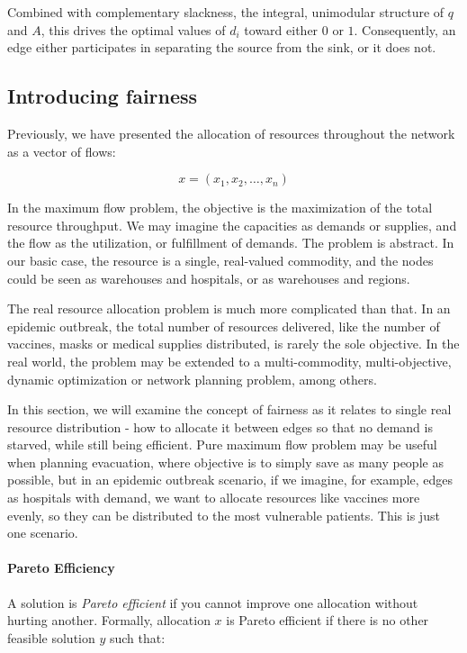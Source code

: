 \documentclass[12pt, openany]{article}
\begin{document}
Combined with complementary slackness, the integral, unimodular structure of \(q\) and \(A\), this drives the optimal values of \(d_i\) toward either \(0\) or \(1\). Consequently, an edge either participates in separating the source from the sink, or it does not.


\subsection{Introducing fairness}

Previously, we have presented the allocation of resources throughout the network as a vector of flows:

\[
x = (x_1, x_2, \dots, x_n)
\]

In the maximum flow problem, the objective is the maximization of the total resource throughput. We may imagine the capacities as demands or supplies, and the flow as the utilization, or fulfillment of demands. The problem is abstract. In our basic case, the resource is a single, real-valued commodity, and the nodes could be seen as warehouses and hospitals, or as warehouses and regions.

The real resource allocation problem is much more complicated than that. In an epidemic outbreak, the total number of resources delivered, like the number of vaccines, masks or medical supplies distributed, is rarely the sole objective. In the real world, the problem may be extended to a multi-commodity, multi-objective, dynamic optimization or network planning problem, among others.

In this section, we will examine the concept of fairness as it relates to single real resource distribution - how to allocate it between edges so that no demand is starved, while still being efficient. Pure maximum flow problem may be useful when planning evacuation, where objective is to simply save as many people as possible, but in an epidemic outbreak scenario, if we imagine, for example, edges as hospitals with demand, we want to allocate resources like vaccines more evenly, so they can be distributed to the most vulnerable patients. This is just one scenario.


\paragraph{\textbf{Pareto Efficiency}} A solution is \textit{Pareto efficient} if you cannot improve one allocation without hurting another. Formally, allocation $x$ is Pareto efficient if there is no other feasible solution $y$ such that:
\end{document}
